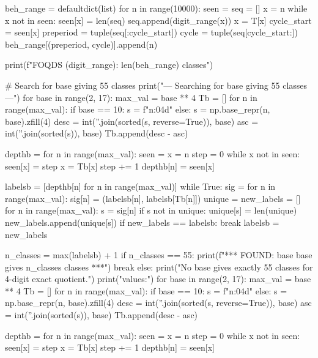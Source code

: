 {{{{{{{{{{{{{beh_range = defaultdict(list)
for n in range(10000):
    seen = {}
    seq = []
    x = n
    while x not in seen:
        seen[x] = len(seq)
        seq.append(digit_range(x))
        x = T[x]
    cycle_start = seen[x]
    preperiod = tuple(seq[:cycle_start])
    cycle = tuple(seq[cycle_start:])
    beh_range[(preperiod, cycle)].append(n)

print(f"FOQDS (digit_range): {len(beh_range)} classes")

# Search for base giving 55 classes
print("\n--- Searching for base giving 55 classes ---")
for base in range(2, 17):
    max_val = base ** 4
    Tb = []
    for n in range(max_val):
        if base == 10:
            s = f"{n:04d}"
        else:
            s = np.base_repr(n, base).zfill(4)
        desc = int(''.join(sorted(s, reverse=True)), base)
        asc = int(''.join(sorted(s)), base)
        Tb.append(desc - asc)
    
    depthb = {}
    for n in range(max_val):
        seen = {}
        x = n
        step = 0
        while x not in seen:
            seen[x] = step
            x = Tb[x]
            step += 1
        depthb[n] = seen[x]
    
    labelsb = [depthb[n] for n in range(max_val)]
    while True:
        sig = {}
        for n in range(max_val):
            sig[n] = (labelsb[n], labelsb[Tb[n]])
        unique = {}
        new_labels = []
        for n in range(max_val):
            s = sig[n]
            if s not in unique:
                unique[s] = len(unique)
            new_labels.append(unique[s])
        if new_labels == labelsb:
            break
        labelsb = new_labels
    
    n_classes = max(labelsb) + 1
    if n_classes == 55:
        print(f"*** FOUND: base {base} gives {n_classes} classes ***")
        break
else:
    print("No base gives exactly 55 classes for 4-digit exact quotient.")
    print("\nClosest values:")
    for base in range(2, 17):
        max_val = base ** 4
        Tb = []
        for n in range(max_val):
            if base == 10:
                s = f"{n:04d}"
            else:
                s = np.base_repr(n, base).zfill(4)
            desc = int(''.join(sorted(s, reverse=True)), base)
            asc = int(''.join(sorted(s)), base)
            Tb.append(desc - asc)
        
        depthb = {}
        for n in range(max_val):
            seen = {}
            x = n
            step = 0
            while x not in seen:
                seen[x] = step
                x = Tb[x]
                step += 1
            depthb[n] = seen[x]
        
}}}}}}}}}}}}}

